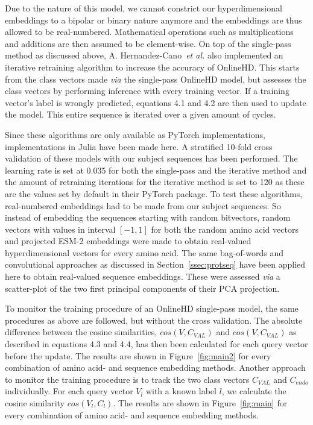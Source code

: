 Due to the nature of this model, we cannot constrict our hyperdimensional embeddings to a bipolar or binary nature anymore and the embeddings are thus allowed to be real-numbered. Mathematical operations such as multiplications and additions are then assumed to be element-wise. On top of the single-pass method as discussed above, A. Hernandez-Cano~\textit{et al.} also implemented an iterative retraining algorithm to increase the accuracy of OnlineHD. This starts from the class vectors made \textit{via} the single-pass OnlineHD model, but assesses the class vectors by performing inference with every training vector. If a training vector's label is wrongly predicted, equations 4.1 and 4.2 are then used to update the model. This entire sequence is iterated over a given amount of cycles.

Since these algorithms are only available as PyTorch implementations, implementations in Julia have been made here. A stratified 10-fold cross validation of these models with our subject sequences has been performed. The learning rate is set at 0.035 for both the single-pass and the iterative method and the amount of retraining iterations for the iterative method is set to 120 as these are the values set by default in their PyTorch package. To test these algorithms, real-numbered embeddings had to be made from our subject sequences. So instead of embedding the sequences starting with random bitvectors, random vectors with values in interval $[-1, 1]$ for both the random amino acid vectors and projected ESM-2 embeddings were made to obtain real-valued hyperdimensional vectors for every amino acid. The same bag-of-words and convolutional approaches as discussed in Section~\ref{ssec:protseq} have been applied here to obtain real-valued sequence embeddings. These were assessed \textit{via} a scatter-plot of the two first principal components of their PCA projection.

To monitor the training procedure of an OnlineHD single-pass model, the same procedures as above are followed, but without the cross validation. The absolute difference between the cosine similarities, $cos(V, C_{VAL})$ and $cos(V, C_{VAL})$ as described in equations 4.3 and 4.4, has then been calculated for each query vector before the update. The results are shown in Figure~\ref{fig:main2} for every combination of amino acid- and sequence embedding methods. Another approach to monitor the training procedure is to track the two class vectors $C_{VAL}$ and $C_{endo}$ individually. For each query vector $V_{l}$ with a known label $l$, we calculate the cosine similarity $cos(V_{l}, C_{l})$. The results are shown in Figure~\ref{fig:main} for every combination of amino acid- and sequence embedding methods. 

